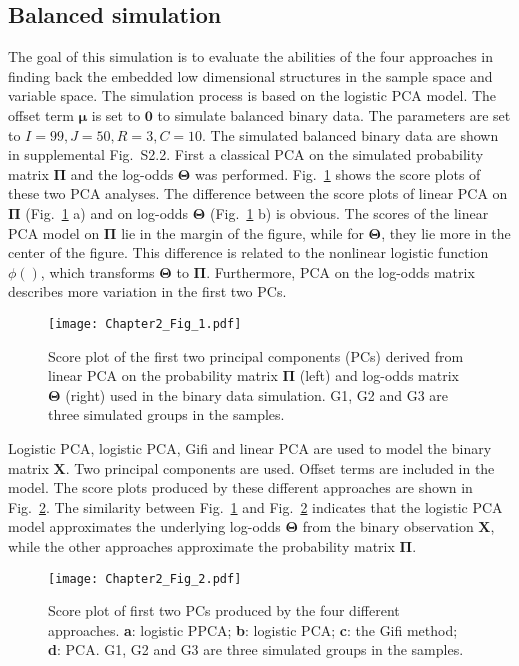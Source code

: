 \subsection{Balanced simulation}
The goal of this simulation is to evaluate the abilities of the four approaches in finding back the embedded low dimensional structures in the sample space and variable space. The simulation process is based on the logistic PCA model. The offset term $\bm{\mu}$ is set to $\mathbf{0}$ to simulate balanced binary data. The parameters are set to $I = 99, J = 50, R = 3, C = 10$. The simulated balanced binary data are shown in supplemental Fig.~S2.2. First a classical PCA on the simulated probability matrix $\mathbf{\Pi}$ and the log-odds $\mathbf{\Theta}$ was performed. Fig.~\ref{chapter2_fig:1} shows the score plots of these two PCA analyses. The difference between the score plots of linear PCA on $\mathbf{\Pi}$ (Fig.~\ref{chapter2_fig:1} a) and on log-odds $\mathbf{\Theta}$ (Fig.~\ref{chapter2_fig:1} b) is obvious. The scores of the linear PCA model on $\mathbf{\Pi}$ lie in the margin of the figure, while for $\mathbf{\Theta}$, they lie more in the center of the figure. This difference is related to the nonlinear logistic function $\phi()$, which transforms $\mathbf{\Theta}$ to $\mathbf{\Pi}$. Furthermore, PCA on the log-odds matrix describes more variation in the first two PCs.
\begin{figure}[htbp]
    \centering
    \texttt{[image: Chapter2\_Fig\_1.pdf]}
    \caption{Score plot of the first two principal components (PCs) derived from linear PCA on the probability matrix $\mathbf{\Pi}$ (left) and  log-odds matrix $\mathbf{\Theta}$ (right) used in the binary data simulation. G1, G2 and G3 are three simulated groups in the samples.}
    \label{chapter2_fig:1}
\end{figure}

Logistic PCA, logistic PCA, Gifi and linear PCA are used to model the binary matrix $\mathbf{X}$. Two principal components are used. Offset terms are included in the model. The score plots produced by these different approaches are shown in Fig.~\ref{chapter2_fig:2}. The similarity between Fig.~\ref{chapter2_fig:1} and Fig.~\ref{chapter2_fig:2} indicates that the logistic PCA model approximates the underlying log-odds $\mathbf{\Theta}$ from the binary observation $\mathbf{X}$, while the other approaches approximate the probability matrix $\mathbf{\Pi}$.
\begin{figure}[htbp]
    \centering
    \texttt{[image: Chapter2\_Fig\_2.pdf]}
    \caption{Score plot of first two PCs produced by the four different approaches. \textbf{a}: logistic PPCA; \textbf{b}: logistic PCA; \textbf{c}: the Gifi method; \textbf{d}: PCA. G1, G2 and G3 are three simulated groups in the samples.}
    \label{chapter2_fig:2}
\end{figure}

